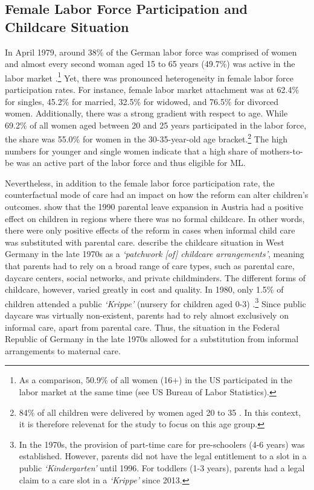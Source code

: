 \bigskip
\subsection{Female Labor Force Participation and Childcare Situation}
In April 1979, around 38\% of the German labor force was comprised of women and almost every second woman aged 15 to 65 years (49.7\%) was active in the labor market \citep{federalstatisticaloffice1981yearbook}.\footnote{As a comparison, 50.9\% of all women (16$+$) in the US participated in the labor market at the same time (see US Bureau of Labor Statistics).} Yet, there was pronounced heterogeneity in female labor force participation rates. For instance, female labor market attachment was at 62.4\% for singles, 45.2\% for married, 32.5\% for widowed, and 76.5\% for divorced women. Additionally, there was a strong gradient with respect to age. While 69.2\% of all women aged between 20 and 25 years participated in the labor force, the share was 55.0\% for women in the 30-35-year-old age bracket.\footnote{84\% of all children were delivered by women aged 20 to 35 \citep{federalstatisticaloffice1981yearbook}. In this context, it is therefore relevenat for the study to focus on this age group.} The high numbers for younger and single women indicate that a high share of mothers-to-be was an active part of the labor force and thus eligible for ML.

Nevertheless, in addition to the female labor force participation rate, the counterfactual mode of care had an impact on how the reform can alter children's outcomes. \cite{danzer2019parental} show that the 1990 parental leave expansion in Austria had a positive effect on children in regions where there was no formal childcare. In other words, there were only positive effects of the reform in cases when informal child care was substituted with parental care. \cite{hank2001childcare} describe the childcare situation in West Germany in the late 1970s as a \textit{`patchwork [of] childcare arrangements'}, meaning that parents had to rely on a broad range of care types, such as parental care, daycare centers, social networks, and private childminders. The different forms of childcare, however, varied greatly in cost and quality. In 1980, only 1.5\% of children attended a public \textit{`Krippe'} (nursery for children aged 0-3) \citep[p.~34]{bildungsbericht2006}.\footnote{In the 1970s, the provision of part-time care for pre-schoolers (4-6 years) was established. However, parents did not have the legal entitlement to a slot in a public \textit{`Kindergarten'} until 1996. For toddlers (1-3 years), parents had a legal claim to a care slot in a \textit{`Krippe'} since 2013.} Since public daycare was virtually non-existent, parents had to rely almost exclusively on informal care, apart from parental care. Thus, the situation in the Federal Republic of Germany in the late 1970s allowed for a substitution from informal arrangements to maternal care. 

